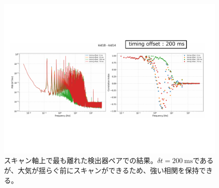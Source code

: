 \begin{figure}[htbp]
  \centering
  \includegraphics[width=1.05\columnwidth]{5_alignment/figs/timing_offset_compare2.pdf}
  \caption{スキャン軸上で最も離れた検出器ペアでの結果。$\delta t=\SI{200}{\mathrm{ms}}$であるが、大気が揺らぐ前にスキャンができるため、強い相関を保持できる。}
  \label{timing_offset_compare2}
\end{figure}

